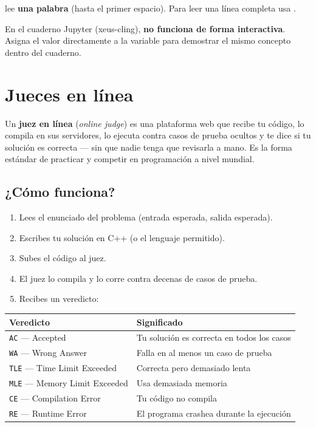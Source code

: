 \documentclass[12pt, oneside]{article}
\begin{document}
\begin{consejo}
   lee \textbf{una palabra} (hasta el primer espacio). Para leer
  una línea completa usa .
\end{consejo}

\begin{advertencia}
  En el cuaderno Jupyter (xeus-cling),  \textbf{no funciona de forma
  interactiva}. Asigna el valor directamente a la variable para demostrar
  el mismo concepto dentro del cuaderno.
\end{advertencia}

\section{Jueces en línea}

Un \textbf{juez en línea} (\textit{online judge}) es una plataforma web que
recibe tu código, lo compila en sus servidores, lo ejecuta contra casos de
prueba ocultos y te dice si tu solución es correcta — sin que nadie tenga que
revisarla a mano. Es la forma estándar de practicar y competir en programación
a nivel mundial.

\subsection{¿Cómo funciona?}

\begin{enumerate}
  \item Lees el enunciado del problema (entrada esperada, salida esperada).
  \item Escribes tu solución en C++ (o el lenguaje permitido).
  \item Subes el código al juez.
  \item El juez lo compila y lo corre contra decenas de casos de prueba.
  \item Recibes un veredicto:
\end{enumerate}

\begin{center}
\begin{tabular}{ll}
  \toprule
  \textbf{Veredicto} & \textbf{Significado} \\
  \midrule
  \texttt{AC} — Accepted           & Tu solución es correcta en todos los casos \\
  \texttt{WA} — Wrong Answer       & Falla en al menos un caso de prueba \\
  \texttt{TLE} — Time Limit Exceeded & Correcta pero demasiado lenta \\
  \texttt{MLE} — Memory Limit Exceeded & Usa demasiada memoria \\
  \texttt{CE} — Compilation Error  & Tu código no compila \\
  \texttt{RE} — Runtime Error      & El programa crashea durante la ejecución \\
  \bottomrule
\end{tabular}
\end{center}
\end{document}
